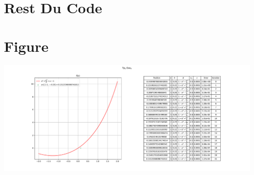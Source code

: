 \vspace{1cm}

\section{Rest Du Code}


\vspace{1.5cm}
\section{Figure}

\begin{center}
    \includegraphics[height=0.35\textheight]{Exercices/EX3/Fig.pdf}
\end{center}
